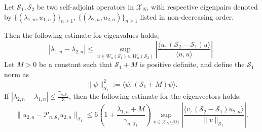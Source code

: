 \documentclass[10pt,a4paper]{amsart}
\begin{document}
\begin{proposition}
    \label{Prop04}
    Let $\mathcal{S}_1, \mathcal{S}_2$ be two self-adjoint operators in $\mathscr{X}_N$, with respective eigenpairs denoted by $\{(\lambda_{1,n},u_{1,n})\}_{n\geq 1},\ \{(\lambda_{2,n},u_{2,n})\}_{n\geq1}$ listed in non-decreasing order. 

    Then the following estimate for eigenvalues holds,
    \begin{equation}\label{Eq-prop04-01}
        |\lambda_{1,n}-\lambda_{2,n}|\leq \sup_{u\in W_n(\mathcal{S}_1)\cup W_n(\mathcal{S}_2)} \left|\frac{\langle u,(\mathcal{S}_2-\mathcal{S}_1)u\rangle}{\langle u,u\rangle}\right|.
    \end{equation}
   Let $M > 0$ be a constant such that $\mathcal{S}_1 + M$ is positive definite, and define the $\mathcal{S}_1$ norm as 
    \[
    \|\psi\|_{\mathcal{S}_1}^2 := \langle \psi, (\mathcal{S}_1 + M)\psi \rangle.
    \]
    If $ |\lambda_{2,n} - \lambda_{1,n}| \leq \frac{\gamma_{n,\mathcal{S}_1}}{3} $,
    then the following estimate for the eigenvectors holds:
    \begin{equation}\label{Eq-prop04-02}
        \| u_{2,n}-\mathcal{P}_{n,\mathcal{S}_1}u_{2,n}\| _{\mathcal{S}_1}\leq 6(1+\frac{\lambda_{1,n}+M}{\gamma_{n,\mathcal{S}_1}})\sup_{v\in \mathscr{X}_N\setminus\{0\}}\left|\frac{\langle v,(\mathcal{S}_2-\mathcal{S}_1)u_{2,n}\rangle}{\|v\|_{\mathcal{S}_1}}\right|.
    \end{equation}
\end{proposition}
\end{document}
